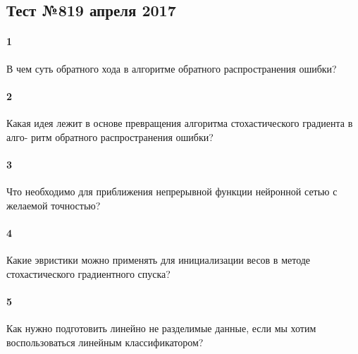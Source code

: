 \documentclass[a4paper,12pt]{article}
\begin{document}
  \subsection*{Тест №8\hfill{19 апреля 2017}}

  \paragraph{1} В чем суть обратного хода в алгоритме обратного распространения ошибки?
  
  \makebox[\linewidth]{\hrulefill}
  \makebox[\linewidth]{\hrulefill}
  \makebox[\linewidth]{\hrulefill}
  \makebox[\linewidth]{\hrulefill}
  
  \paragraph{2} Какая идея лежит в основе превращения алгоритма стохастического градиента в алго-
ритм обратного распространения ошибки?
  
  \makebox[\linewidth]{\hrulefill}
  \makebox[\linewidth]{\hrulefill}
  \makebox[\linewidth]{\hrulefill}
  \makebox[\linewidth]{\hrulefill}

  \paragraph{3} Что необходимо для приближения непрерывной функции нейронной сетью с желаемой
точностью?

  \makebox[\linewidth]{\hrulefill}
  \makebox[\linewidth]{\hrulefill}
  \makebox[\linewidth]{\hrulefill}

  \paragraph{4} Какие эвристики можно применять для инициализации весов в методе стохастического градиентного спуска?
    
  \makebox[\linewidth]{\hrulefill}
  \makebox[\linewidth]{\hrulefill}
  \makebox[\linewidth]{\hrulefill}
  
  \paragraph{5} Как нужно подготовить линейно не разделимые данные, если мы хотим воспользоваться линейным классификатором?

  \makebox[\linewidth]{\hrulefill}
  \makebox[\linewidth]{\hrulefill}
  \makebox[\linewidth]{\hrulefill}
  \makebox[\linewidth]{\hrulefill}
  
\end{document}
